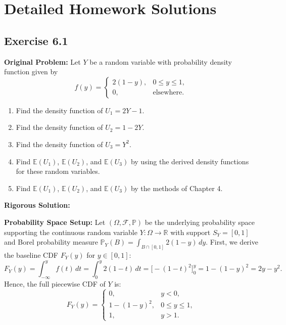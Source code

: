 \documentclass[11pt, letterpaper]{article}
\theoremstyle{definition}
\theoremstyle{remark}
\newcommand{\R}{\mathbb{R}}
\newcommand{\E}{\mathbb{E}}
\newcommand{\Prob}{\mathbb{P}}
\newcommand{\F}{\mathcal{F}}
\begin{document}
\newpage
\section{Detailed Homework Solutions}

\subsection{Exercise 6.1}

\textbf{Original Problem:}
Let $Y$ be a random variable with probability density function given by
\[
    f(y) = \begin{cases} 2(1 - y), & 0 \le y \le 1, \\ 0, & \text{elsewhere.} \end{cases}
\]
\begin{enumerate}[label=\textbf{\alph*}]
    \item Find the density function of $U_1 = 2Y - 1$.
    \item Find the density function of $U_2 = 1 - 2Y$.
    \item Find the density function of $U_3 = Y^2$.
    \item Find $\E(U_1)$, $\E(U_2)$, and $\E(U_3)$ by using the derived density functions for these random variables.
    \item Find $\E(U_1)$, $\E(U_2)$, and $\E(U_3)$ by the methods of Chapter 4.
\end{enumerate}

\hrulefill

\textbf{Rigorous Solution:}

\textbf{Probability Space Setup:} Let $(\Omega, \F, \Prob)$ be the underlying probability space supporting the continuous random variable $Y : \Omega \to \R$ with support $S_Y = [0, 1]$ and Borel probability measure $\Prob_Y(B) = \int_{B \cap [0,1]} 2(1-y)\,dy$. First, we derive the baseline CDF $F_Y(y)$ for $y \in [0, 1]$:
\[
    F_Y(y) = \int_{-\infty}^{y} f(t)\,dt = \int_{0}^{y} 2(1 - t)\,dt = \Big[ -(1 - t)^2 \Big]_{0}^{y} = 1 - (1 - y)^2 = 2y - y^2.
\]
Hence, the full piecewise CDF of $Y$ is:
\[
    F_Y(y) = \begin{cases} 0, & y < 0, \\ 1 - (1 - y)^2, & 0 \le y \le 1, \\ 1, & y > 1. \end{cases}
\]
\end{document}
